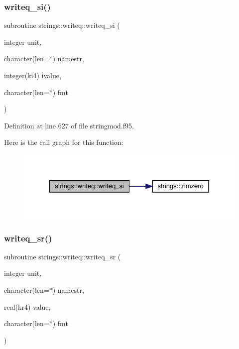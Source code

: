 \subsubsection{\texorpdfstring{writeq\+\_\+si()}{writeq\_si()}}
{\footnotesize\ttfamily subroutine strings\+::writeq\+::writeq\+\_\+si (\begin{DoxyParamCaption}\item[{integer}]{unit,  }\item[{character(len=$\ast$)}]{namestr,  }\item[{integer(ki4)}]{ivalue,  }\item[{character(len=$\ast$)}]{fmt }\end{DoxyParamCaption})}



Definition at line 627 of file stringmod.\+f95.

Here is the call graph for this function\+:\nopagebreak
\begin{figure}[H]
\begin{center}
\leavevmode
\includegraphics[width=326pt]{interfacestrings_1_1writeq_af7f414c54607f15965a0e67c7702aa9c_cgraph}
\end{center}
\end{figure}
\mbox{\label{interfacestrings_1_1writeq_a2c9743fd678c7eb3387f7acae35de200}} 
\subsubsection{\texorpdfstring{writeq\+\_\+sr()}{writeq\_sr()}}
{\footnotesize\ttfamily subroutine strings\+::writeq\+::writeq\+\_\+sr (\begin{DoxyParamCaption}\item[{integer}]{unit,  }\item[{character(len=$\ast$)}]{namestr,  }\item[{real(kr4)}]{value,  }\item[{character(len=$\ast$)}]{fmt }\end{DoxyParamCaption})}



